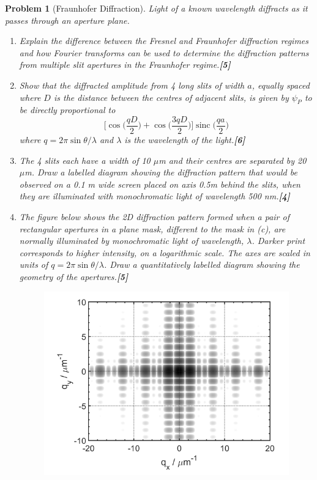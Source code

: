 \documentclass[a4paper]{article}
\DeclareMathOperator{\sinc}{sinc}
\theoremstyle{new}
\newtheorem{qns}{Problem}[subsection]
\begin{document}
\begin{qns}[Fraunhofer Diffraction]
Light of a known wavelength diffracts as it passes through an aperture plane.
\begin{enumerate}[label=(\alph*)]
\item Explain the difference between the Fresnel and Fraunhofer diffraction regimes and how Fourier transforms can be used to determine the diffraction patterns from multiple slit apertures in the Fraunhofer regime.\hfill\textbf{[5]}
\item Show that the diffracted amplitude from 4 long slits of width $a$, equally spaced where $D$ is the distance between the centres of adjacent slits, is given by $\psi_P$ to be directly proportional to
$$\bigg[\cos\bigg(\frac{qD}{2}\bigg)+\cos\bigg(\frac{3qD}{2}\bigg)\bigg]\sinc\bigg(\frac{qa}{2}\bigg)$$
where $q = 2\pi\sin\theta/\lambda$ and $\lambda$ is the wavelength of the light.\hfill\textbf{[6]}
\item The 4 slits each have a width of 10 $\mu$m and their centres are separated by 20 $\mu$m. Draw a labelled diagram showing the diffraction pattern that would be observed on a 0.1 m wide screen placed on axis 0.5m behind the slits, when they are illuminated with monochromatic light of wavelength 500 nm.\hfill\textbf{[4]}
\item The figure below shows the 2D diffraction pattern formed when a pair of rectangular apertures in a plane mask, different to the mask in (c), are normally illuminated by monochromatic light of wavelength, $\lambda$. Darker print corresponds to higher intensity, on a logarithmic scale. The axes are scaled in units of $q = 2\pi\sin\theta/\lambda$. Draw a quantitatively labelled diagram showing the geometry of the apertures.\hfill\textbf{[5]}
\begin{figure}[H]
    \centering
    \includegraphics[width=\linewidth]{2019P2B8Q.PNG}
\end{figure}
\end{enumerate}
\end{qns}
\end{document}
